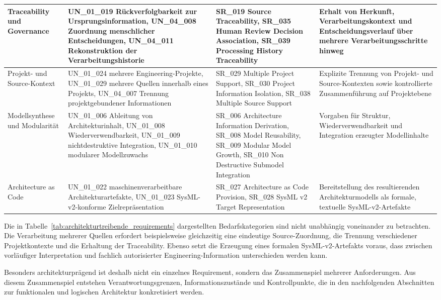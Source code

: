 \begin{table}[htbp]
\begin{tabular}{|p{2.8cm}|p{4.3cm}|p{4.2cm}|p{4.3cm}|}
Traceability und Governance &
UN\_01\_019 Rückverfolgbarkeit zur Ursprungsinformation,
UN\_04\_008 Zuordnung menschlicher Entscheidungen,
UN\_04\_011 Rekonstruktion der Verarbeitungshistorie &
SR\_019 Source Traceability,
SR\_035 Human Review Decision Association,
SR\_039 Processing History Traceability &
Erhalt von Herkunft, Verarbeitungskontext und Entscheidungsverlauf über
mehrere Verarbeitungsschritte hinweg \\
\hline

Projekt- und Source-Kontext &
UN\_01\_024 mehrere Engineering-Projekte,
UN\_01\_029 mehrere Quellen innerhalb eines Projekts,
UN\_04\_007 Trennung projektgebundener Informationen &
SR\_029 Multiple Project Support,
SR\_030 Project Information Isolation,
SR\_038 Multiple Source Support &
Explizite Trennung von Projekt- und Source-Kontexten sowie kontrollierte
Zusammenführung auf Projektebene \\
\hline

Modellsynthese und Modularität &
UN\_01\_006 Ableitung von Architekturinhalt,
UN\_01\_008 Wiederverwendbarkeit,
UN\_01\_009 nichtdestruktive Integration,
UN\_01\_010 modularer Modellzuwachs &
SR\_006 Architecture Information Derivation,
SR\_008 Model Reusability,
SR\_009 Modular Model Growth,
SR\_010 Non Destructive Submodel Integration &
Vorgaben für Struktur, Wiederverwendbarkeit und Integration erzeugter
Modellinhalte \\
\hline

Architecture as Code &
UN\_01\_022 maschinenverarbeitbare Architekturartefakte,
UN\_01\_023 SysML-v2-konforme Zielrepräsentation &
SR\_027 Architecture as Code Provision,
SR\_028 SysML v2 Target Representation &
Bereitstellung des resultierenden Architekturmodells als formale,
textuelle SysML-v2-Artefakte \\
\hline
\end{tabular}
\end{table}

Die in Tabelle~\ref{tab:architekturtreibende_requirements} dargestellten
Bedarfskategorien sind nicht unabhängig voneinander zu betrachten. Die
Verarbeitung mehrerer Quellen erfordert beispielsweise gleichzeitig eine
eindeutige Source-Zuordnung, die Trennung verschiedener Projektkontexte und die
Erhaltung der Traceability. Ebenso setzt die Erzeugung eines formalen
SysML-v2-Artefakts voraus, dass zwischen vorläufiger Interpretation und
fachlich autorisierter Engineering-Information unterschieden werden kann.

Besonders architekturprägend ist deshalb nicht ein einzelnes Requirement,
sondern das Zusammenspiel mehrerer Anforderungen. Aus diesem Zusammenspiel
entstehen Verantwortungsgrenzen, Informationszustände und Kontrollpunkte, die in
den nachfolgenden Abschnitten zur funktionalen und logischen Architektur
konkretisiert werden.

